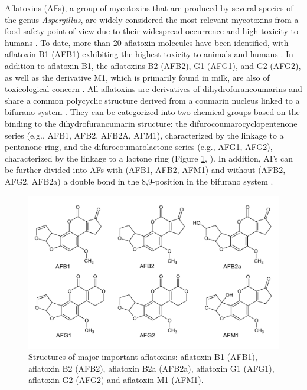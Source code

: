 Aflatoxins (AFs), a group of mycotoxins that are produced by several species of the genus \textit{Aspergillus}, are widely considered the most relevant mycotoxins from a food safety point of view due to their widespread occurrence and high toxicity to humans \citep{afsah2013review, jallow2021worldwide}. To date, more than 20 aflatoxin molecules have been identified, with aflatoxin B1 (AFB1) exhibiting the highest toxicity to animals and humans \citep{ismail2018aflatoxin}. In addition to aflatoxin B1, the aflatoxins B2 (AFB2), G1 (AFG1), and G2 (AFG2),  as well as the derivative M1, which is primarily found in milk, are also of toxicological concern \citep{caceres2020aflatoxin, haque2020mycotoxin}. All aflatoxins are derivatives of dihydrofurancoumarins and share a common polycyclic structure derived from a coumarin nucleus linked to a bifurano system \citep{abrehame2023aflatoxins, nazhand2020characteristics}. They can be categorized into two chemical groups based on the binding to the dihydrofurancumarin structure: the difurocoumarocyclopentenone series (e.g., AFB1, AFB2, AFB2A, AFM1), characterized by the linkage to a pentanone ring, and the difurocoumarolactone series (e.g., AFG1, AFG2), characterized by the linkage to a lactone ring (Figure \ref{fig:Aflatoxins_structures_portrait}, \cite{abrehame2023aflatoxins, nazhand2020characteristics}). In addition, AFs can be further divided into AFs with (AFB1, AFB2, AFM1) and without (AFB2, AFG2, AFB2a) a double bond in the 8,9-position in the bifurano system \citep{abrehame2023aflatoxins}. 

\begin{figure}[ht!]
	\centering
	\includegraphics[width=1\textwidth]{figures/aflatoxins_structures_portrait.pdf}
	\decoRule
	\captionsetup{labelfont=bf, justification=justified, singlelinecheck=false, width=1\textwidth} 
	\caption{Structures of major important aflatoxins: aflatoxin B1 (AFB1), aflatoxin B2 (AFB2), aflatoxin B2a (AFB2a), aflatoxin G1 (AFG1), aflatoxin G2 (AFG2) and aflatoxin M1 (AFM1).}
	\label{fig:Aflatoxins_structures_portrait}
\end{figure}

